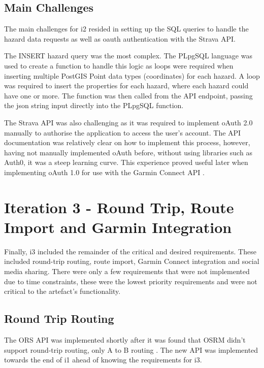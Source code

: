 \subsection{Main Challenges}
\label{iteration2:main-challenges}

The main challenges for i2 resided in setting up the SQL queries to handle the hazard data requests as well as oauth authentication with the Strava API.

The INSERT hazard query was the most complex. The PLpgSQL language was used to create a function to handle this logic as loops were required when inserting multiple PostGIS Point data types (coordinates) for each hazard. A loop was required to insert the properties for each hazard, where each hazard could have one or more. The function was then called from the API endpoint, passing the json string input directly into the PLpgSQL function.

The Strava API was also challenging as it was required to implement oAuth 2.0 manually to authorise the application to access the user's account. The API documentation was relatively clear on how to implement this process, however, having not manually implemented oAuth before, without using libraries such as Auth0, it was a steep learning curve. This experience proved useful later when implementing oAuth 1.0 for use with the Garmin Connect API .

\clearpage
\section{Iteration 3 - Round Trip, Route Import and Garmin Integration}
\label{implementation:iteration3}

Finally, i3 included the remainder of the critical and desired requirements. These included round-trip routing, route import, Garmin Connect integration and social media sharing. There were only a few requirements that were not implemented due to time constraints, these were the lowest priority requirements and were not critical to the artefact's functionality.

\subsection{Round Trip Routing}
\label{iteration3:round-trip}

The ORS API was implemented shortly after it was found that OSRM didn't support round-trip routing, only A to B routing . The new API was implemented towards the end of i1 ahead of knowing the requirements for i3. 

